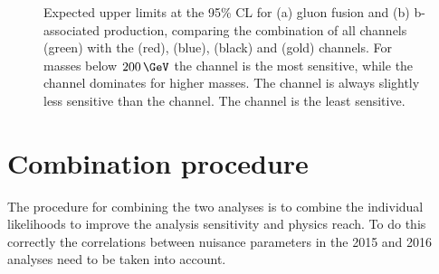 \begin{figure}[h!]
\begin{center}
\end{center}
\caption[Expected upper limits at the 95\% CL for the gluon fusion and b-associated
production, comparing the combination of all channels with the per-channel limits.]{Expected upper limits at the 95\% \ac{CL} for (a) gluon fusion and (b) b-associated production,
comparing the combination of all channels (green) with the \mutau (red), \etau (blue), \tautau (black)
and \emu (gold) channels. For masses below $200\,\GeV$ the \mutau channel is the most sensitive,
while the \tautau channel dominates for higher masses. The \etau channel is always
slightly less sensitive than the \mutau channel. The \emu channel is the least sensitive.}
\label{fig:mssm_results_limits_breakdown_hig16006}
\end{figure}
\clearpage


\section{Combination procedure}
\label{sec:mssm_combination_procedure}
The procedure for combining the two analyses is to combine the 
individual likelihoods to improve the analysis sensitivity and
physics reach. To do this correctly the correlations between
nuisance parameters in the 2015 and 2016 analyses need to be taken into account.

